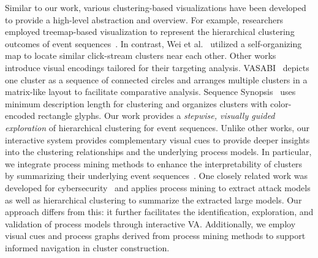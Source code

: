 \documentclass[preprint,journal]{vgtc}            %
\begin{document}
Similar to our work, various clustering-based visualizations have been developed to provide a high-level abstraction and overview.
For example, researchers employed treemap-based visualization to represent the hierarchical clustering outcomes of event sequences~\cite{Makanju08LogView, Gotz11Visual, Wang06Visualization}.
In contrast, Wei et al.~\cite{Wei12Visual} utilized a self-organizing map to locate similar click-stream clusters near each other.
Other works introduce visual encodings tailored for their targeting analysis. VASABI~\cite{Nguyen20VASABI} depicts one cluster as a sequence of connected circles and arranges multiple clusters in a matrix-like layout to facilitate comparative analysis.
Sequence Synopsis~\cite{Chen18Sequence} uses minimum description length for clustering and organizes clusters with color-encoded rectangle glyphs.
Our work provides a \textit{stepwise, visually guided exploration} of hierarchical clustering for event sequences.
Unlike other works, our interactive system provides complementary visual cues to provide deeper insights into the clustering relationships and the underlying process models. %
In particular, we integrate process mining methods to enhance the interpretability of clusters by summarizing their underlying event sequences~\cite{Van12Process, Massimiliano16General}.
%
One closely related work was developed for cybersecurity~\cite{Sean18Process} and applies process mining to extract attack models as well as hierarchical clustering to summarize the extracted large models.
Our approach differs from this: it further facilitates the identification, exploration, and validation of process models through interactive VA. 
Additionally, we employ visual cues and process graphs derived from process mining methods to support informed navigation in cluster construction.
\end{document}
